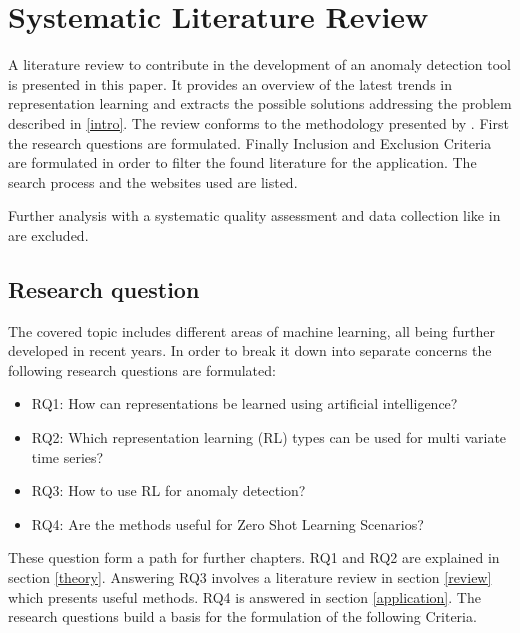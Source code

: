 \section{Systematic Literature Review}\label{methods}
A literature review to contribute in the development of an anomaly detection tool is presented in this paper. It provides an overview of the latest trends in representation learning and extracts the possible solutions addressing the problem described in \ref{intro}. The review conforms to the methodology presented by . First the research questions are formulated. Finally Inclusion and Exclusion Criteria are formulated in order to filter the found literature for the application. The search process and the websites used are listed.

Further analysis with a systematic quality assessment and data collection like in  are excluded.
\subsection{Research question}
The covered topic includes different areas of machine learning, all being further developed in recent years.
In order to break it down into separate concerns the following research questions are formulated:
\begin{itemize}
  \item RQ1: How can representations be learned using artificial intelligence?
  \item RQ2: Which representation learning (RL) types can be used for multi variate time series?
  \item RQ3: How to use RL for anomaly detection?
  \item RQ4: Are the methods useful for Zero Shot Learning Scenarios?
\end{itemize}
These question form a path for further chapters. RQ1 and RQ2 are explained in section \ref{theory}. Answering RQ3 involves a literature review in section \ref{review} which presents useful methods. RQ4 is answered in section \ref{application}. The research questions build a basis for the formulation of the following Criteria.
